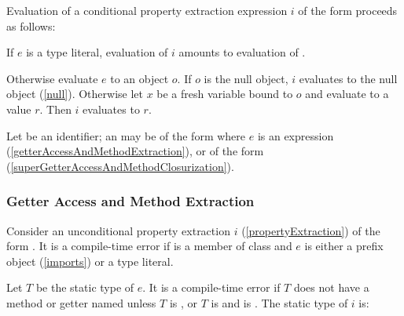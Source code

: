 \documentclass[makeidx]{article}
\begin{document}
\LMHash{}%
Evaluation of a conditional property extraction expression $i$
of the form  proceeds as follows:

\LMHash{}%
If $e$ is a type literal,
evaluation of $i$ amounts to evaluation of .

\LMHash{}%
Otherwise evaluate $e$ to an object $o$.
If $o$ is the null object, $i$ evaluates to the null object (\ref{null}).
Otherwise let $x$ be a fresh variable bound to $o$
and evaluate  to a value $r$.
Then $i$ evaluates to $r$.

\LMHash{}%
Let \id{} be an identifier;
an 
may be of the form  where $e$ is an expression
(\ref{getterAccessAndMethodExtraction}),
or of the form 
(\ref{superGetterAccessAndMethodClosurization}).


\subsubsection{Getter Access and Method Extraction}

\LMHash{}%
Consider an unconditional property extraction $i$
(\ref{propertyExtraction})
of the form .
It is a compile-time error if \id{} is a member of class 
and $e$ is either a prefix object (\ref{imports})
or a type literal.



\LMHash{}%
Let $T$ be the static type of $e$.
It is a compile-time error if $T$ does not have a method or getter named \id{}
unless $T$ is \DYNAMIC{},
or $T$ is \FUNCTION{} and \id{} is .
The static type of $i$ is:
\end{document}
